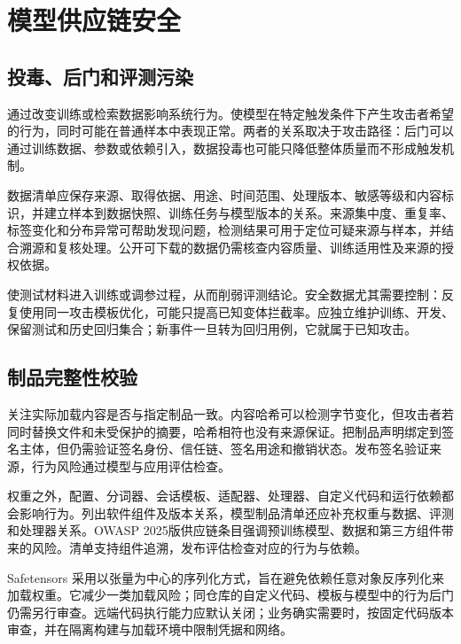 \documentclass[../textbook.tex]{subfiles}
\begin{document}
\section{模型供应链安全}

\subsection{投毒、后门和评测污染}
通过改变训练或检索数据影响系统行为。使模型在特定触发条件下产生攻击者希望的行为，同时可能在普通样本中表现正常。两者的关系取决于攻击路径：后门可以通过训练数据、参数或依赖引入，数据投毒也可能只降低整体质量而不形成触发机制。

数据清单应保存来源、取得依据、用途、时间范围、处理版本、敏感等级和内容标识，并建立样本到数据快照、训练任务与模型版本的关系。来源集中度、重复率、标签变化和分布异常可帮助发现问题，检测结果可用于定位可疑来源与样本，并结合溯源和复核处理。公开可下载的数据仍需核查内容质量、训练适用性及来源的授权依据。

使测试材料进入训练或调参过程，从而削弱评测结论。安全数据尤其需要控制：反复使用同一攻击模板优化，可能只提高已知变体拦截率。应独立维护训练、开发、保留测试和历史回归集合；新事件一旦转为回归用例，它就属于已知攻击。

\subsection{制品完整性校验}
关注实际加载内容是否与指定制品一致。内容哈希可以检测字节变化，但攻击者若同时替换文件和未受保护的摘要，哈希相符也没有来源保证。把制品声明绑定到签名主体，但仍需验证签名身份、信任链、签名用途和撤销状态。发布签名验证来源，行为风险通过模型与应用评估检查。

权重之外，配置、分词器、会话模板、适配器、处理器、自定义代码和运行依赖都会影响行为。列出软件组件及版本关系，模型制品清单还应补充权重与数据、评测和处理器关系。OWASP 2025版供应链条目强调预训练模型、数据和第三方组件带来的风险\cite{owasp2025supplychain}。清单支持组件追溯，发布评估检查对应的行为与依赖。

Safetensors 采用以张量为中心的序列化方式，旨在避免依赖任意对象反序列化来加载权重\cite{huggingface2026safetensors}。它减少一类加载风险；同仓库的自定义代码、模板与模型中的行为后门仍需另行审查。远端代码执行能力应默认关闭；业务确实需要时，按固定代码版本审查，并在隔离构建与加载环境中限制凭据和网络。
\end{document}
